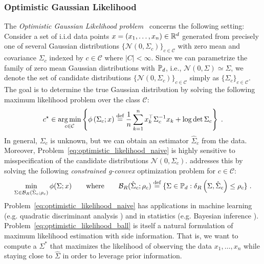 \documentclass[sn-nature]{sn-jnl}%
\theoremstyle{thmstyleone}%
\theoremstyle{thmstyletwo}%
\theoremstyle{thmstylethree}%
\begin{document}
\subsubsection{Optimistic Gaussian Likelihood}\label{sec:GaussianMLE_intro}
 The \emph{Optimistic Gaussian Likelihood problem}~\cite{Nguyen2019CalculatingOL} concerns the following setting: Consider a set of i.i.d data points $x = \left(x_1, \ldots, x_n\right) \in \mathbb{R}^d$ generated from precisely one of several Gaussian distributions $\{\mathcal{N}(0, \Sigma_c)\}_{c \in \mathcal{C}}$ with zero mean and covariance $\Sigma_c$ indexed by $c \in \mathcal{C}$ where $|C| < \infty$. Since we can parametrize the family of zero mean Gaussian distributions with $\mathbb{P}_d$, i.e., $\mathcal{N}(0, \Sigma) \simeq \Sigma$, we denote the set of candidate distributions $\{\mathcal{N}(0, \Sigma_c)\}_{c \in \mathcal{C}}$ simply as $\{\Sigma_c\}_{c \in \mathcal{C}}$.
The goal is to determine the true Gaussian distribution by solving the following maximum likelihood problem over the class $\mathcal{C}$:
%
\begin{equation}\label{eq:optimistic_likelihood_naive}
    c^{\star} \in \underset{c \in \mathcal{C}}{\arg \min }\left\{\phi\left(\Sigma_c; x \right) \stackrel{\text{def}}{=}  \frac{1}{n} \sum_{k=1}^n x_k^{\top} \Sigma_c^{-1}x_k + \log \operatorname{det} \Sigma_c\right\} \; .
\end{equation}
%
In general, $\Sigma_c$ is unknown, but we can obtain an estimator $\hat{\Sigma}_c$ from the data. Moreover, Problem~\eqref{eq:optimistic_likelihood_naive} is highly sensitive to misspecification of the candidate distributions $\mathcal{N}(0, \Sigma_c)$. \cite{Nguyen2019CalculatingOL} addresses this by solving the following \textit{constrained g-convex} optimization problem for $c \in \mathcal{C}$:
%
\begin{equation}\label{eq:optimistic_likelihood_ball}
\min_{\Sigma \in \mathcal{B}_R(\hat{\Sigma}_c; \rho_c)} \phi( \Sigma; x) \qquad \text{where} \qquad  \mathcal{B}_R(\hat{\Sigma}_c; \rho_c) \stackrel{\text{def}}{=} \{\Sigma \in \mathbb{P}_d: \delta_R\left(\Sigma, \hat{\Sigma}_c\right) \leq \rho_c\} \; .
\end{equation}
%
Problem~\eqref{eq:optimistic_likelihood_naive} has applications in machine learning (e.g. quadratic discriminant analysis \cite{discriminant_analysis_sapatinas}) and in statistics (e.g. Bayesian inference \cite{Price2017}). Problem~\eqref{eq:optimistic_likelihood_ball} is itself a natural formulation of maximum likelihood estimation with side information. That is, we want to compute a $\Sigma^*$ that maximizes the likelihood of observing the data $x_{1}, \ldots, x_{n}$ while staying close to $\hat{\Sigma}$ in order to leverage prior information.
\end{document}
